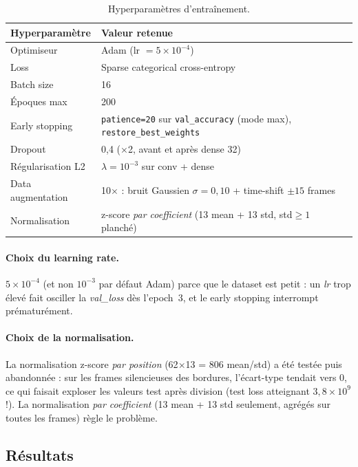 \begin{table}[H]
\centering
\small
\begin{tabularx}{0.85\linewidth}{@{}l X@{}}
\toprule
\textbf{Hyperparamètre} & \textbf{Valeur retenue} \\
\midrule
Optimiseur                  & Adam (lr $= 5 \times 10^{-4}$) \\
Loss                        & Sparse categorical cross-entropy \\
Batch size                  & 16 \\
Époques max                 & 200 \\
Early stopping              & \texttt{patience=20} sur \texttt{val\_accuracy} (mode max), \texttt{restore\_best\_weights} \\
Dropout                     & 0{,}4 (×2, avant et après dense 32) \\
Régularisation L2           & $\lambda = 10^{-3}$ sur conv + dense \\
Data augmentation           & 10$\times$ : bruit Gaussien $\sigma = 0{,}10$ + time-shift $\pm 15$ frames \\
Normalisation               & z-score \emph{par coefficient} (13 mean + 13 std, std$\geq 1$ planché) \\
\bottomrule
\end{tabularx}
\caption{Hyperparamètres d'entraînement.}
\end{table}

\paragraph{Choix du learning rate.} $5 \times 10^{-4}$ (et non $10^{-3}$ par défaut Adam) parce que le dataset est petit : un \emph{lr} trop élevé fait osciller la \emph{val\_loss} dès l'epoch~3, et le early stopping interrompt prématurément.

\paragraph{Choix de la normalisation.} La normalisation z-score \emph{par position} (62$\times$13 = 806 mean/std) a été testée puis abandonnée : sur les frames silencieuses des bordures, l'écart-type tendait vers 0, ce qui faisait exploser les valeurs test après division (test loss atteignant $3{,}8 \times 10^9$ !). La normalisation \emph{par coefficient} (13 mean + 13 std seulement, agrégés sur toutes les frames) règle le problème.

\subsection{Résultats}

